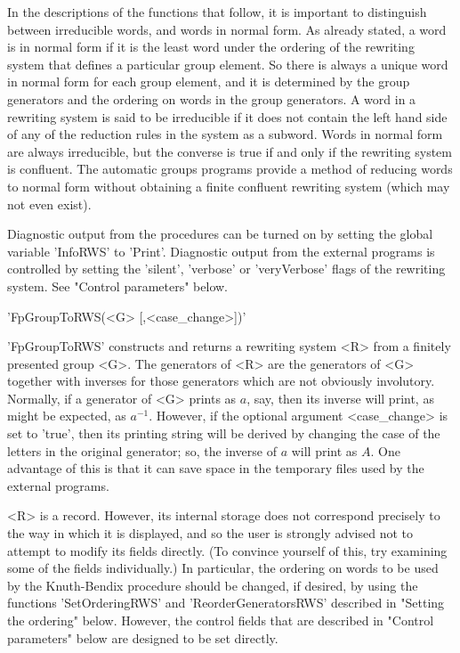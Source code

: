In the descriptions of the  functions that follow,  it is important to
distinguish between  irreducible words, and  words in normal form.  As
already stated, a word is in normal form if it is the least word under
the ordering of the  rewriting system that  defines a particular group
element.  So  there is always  a unique word in  normal form  for each
group element,  and it is  determined by the  group generators and the
ordering on words  in  the group   generators. A word  in a  rewriting
system is said to be irreducible if it  does not contain the left hand
side of any of the reduction  rules in the  system as a subword. Words
in normal form are always irreducible, but the converse is true if and
only   if  the rewriting system  is   confluent.  The automatic groups
programs provide a  method of  reducing  words to normal  form without
obtaining a  finite  confluent rewriting  system  (which may  not even
exist).

Diagnostic  output  from the {\GAP}  procedures   can be turned on  by
setting the global variable  'InfoRWS'  to 'Print'. Diagnostic  output
from the external programs    is controlled by setting  the  'silent',
'verbose' or 'veryVerbose' flags of the rewriting system. See "Control
parameters" below.

'FpGroupToRWS(<G> [,<case\_change>])'

'FpGroupToRWS' constructs and returns a   rewriting system <R> from  a
finitely presented group <G>. The generators of <R> are the generators
of  <G>  together with inverses  for  those  generators  which are not
obviously involutory.  Normally, if a generator of  <G> prints as $a$,
say, then its inverse  will print, as  might be expected, as $a^{-1}$.
However,  if  the optional argument <case\_change>   is set to 'true',
then its printing string  will be derived  by changing the case of the
letters in  the original generator; so,  the inverse of $a$ will print
as  $A$.  One advantage  of this  is that it   can  save space in  the
temporary files used by the external programs.

<R>  is  a  {\GAP} record.  However,   its internal storage   does not
correspond precisely  to the way in which  it is displayed, and so the
user is strongly advised not to attempt to modify its fields directly.
(To convince yourself of  this,   try examining  some of  the   fields
individually.)  In particular, the ordering on words to be used by the
Knuth-Bendix   procedure should be changed, if   desired, by using the
functions  'SetOrderingRWS'  and  'ReorderGeneratorsRWS'  described in
"Setting  the ordering" below.   However, the control  fields that are
described in  "Control parameters"    below  are designed to    be set
directly.

